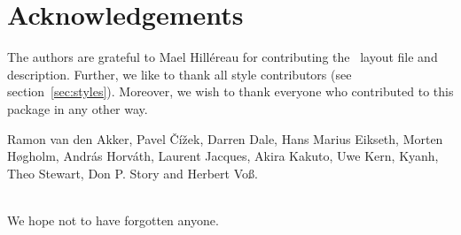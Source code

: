 
\section*{Acknowledgements}

The authors are grateful to Mael Hill\'ereau for contributing the
\LyX\ layout file and description. Further, we like to thank all
style contributors (see section~\ref{sec:styles}). Moreover, we wish
to thank everyone who contributed to this package in any other
way.\\[1em]
\begin{minipage}{.9\linewidth}
Ramon van den Akker, Pavel \v C\'i\v zek, Darren Dale, Hans Marius
Eikseth, Morten H\o gholm, Andr\'as Horv\'ath, Laurent Jacques, Akira
Kakuto, Uwe Kern, Kyanh, Theo Stewart, Don P. Story and Herbert Vo\ss.
\end{minipage}
\\[1em]
We hope not to have forgotten anyone.

\endinput
